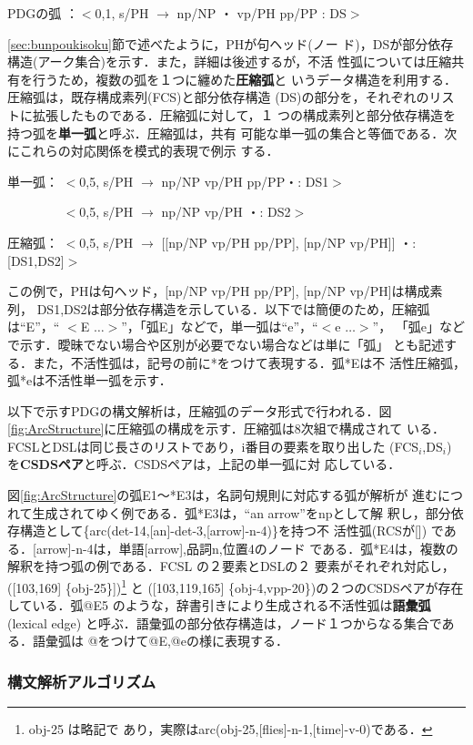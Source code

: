 PDGの弧 ：$<$0,1, s/PH $\rightarrow$ np/NP ・ vp/PH pp/PP : DS$>$

{\mynoindent}\ref{sec:bunpoukisoku}節で述べたように，PHが句ヘッド(ノー
ド)，DSが部分依存構造(アーク集合)を示す．また，詳細は後述するが，不活
性弧については圧縮共有を行うため，複数の弧を１つに纏めた{\bf 圧縮弧}と
いうデータ構造を利用する．圧縮弧は，既存構成素列(FCS)と部分依存構造
(DS)の部分を，それぞれのリストに拡張したものである．圧縮弧に対して，１
つの構成素列と部分依存構造を持つ弧を{\bf 単一弧}と呼ぶ．圧縮弧は，共有
可能な単一弧の集合と等価である．次にこれらの対応関係を模式的表現で例示
する．

単一弧： $<$0,5, s/PH $\rightarrow$ np/NP vp/PH pp/PP・: DS1$>$

　　　　 $<$0,5, s/PH $\rightarrow$ np/NP vp/PH ・: DS2$>$

圧縮弧： $<$0,5, s/PH $\rightarrow$ [[np/NP vp/PH pp/PP], [np/NP vp/PH]] ・: [DS1,DS2]$>$

{\mynoindent}この例で，PHは句ヘッド，[np/NP vp/PH pp/PP], [np/NP vp/PH]は構成素列，
DS1,DS2は部分依存構造を示している．以下では簡便のため，圧縮弧は``E''，``
$<$E ${\ldots}>$''，「弧E」などで，単一弧は``e''，``$<$e ${\ldots}>$''，
「弧e」などで示す．曖昧でない場合や区別が必要でない場合などは単に「弧」
とも記述する．また，不活性弧は，記号の前に*をつけて表現する．弧*Eは不
活性圧縮弧，弧*eは不活性単一弧を示す．

以下で示すPDGの構文解析は，圧縮弧のデータ形式で行われる．図
\ref{fig:ArcStructure}に圧縮弧の構成を示す．圧縮弧は8次組で構成されて
いる．FCSLとDSLは同じ長さのリストであり，i番目の要素を取り出した
(FCS$_i$,DS$_i$) を{\bf CSDSペア}と呼ぶ．CSDSペアは，上記の単一弧に対
応している．

図\ref{fig:ArcStructure}の弧E1〜*E3は，名詞句規則に対応する弧が解析が
進むにつれて生成されてゆく例である．弧*E3は，``an arrow''をnpとして解
釈し，部分依存構造として\{arc(det-14,[an]-det-3,[arrow]-n-4)\}を持つ不
活性弧(RCSが[]) である．[arrow]-n-4は，単語[arrow],品詞n,位置4のノード
である．弧*E4は，複数の解釈を持つ弧の例である．FCSL の２要素とDSLの２
要素がそれぞれ対応し，([103,169] \{obj-25\}])\footnote{obj-25 は略記で
あり，実際はarc(obj-25,[flies]-n-1,[time]-v-0)である．} と
([103,119,165] \{obj-4,vpp-20\})の２つのCSDSペアが存在している．弧@E5 
のような，辞書引きにより生成される不活性弧は{\bf 語彙弧}(lexical edge)
と呼ぶ．語彙弧の部分依存構造は，ノード１つからなる集合である．語彙弧は
@をつけて@E,@eの様に表現する．


\subsubsection{構文解析アルゴリズム}

